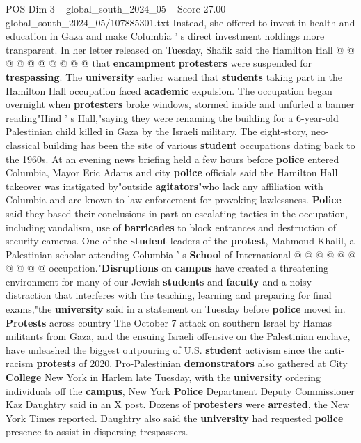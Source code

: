 \begin{textsample}{POS Dim 3 – global\_south\_2024\_05 – Score 27.00 – global\_south\_2024\_05/107885301.txt}
Instead, she offered to invest in health and education in Gaza and make Columbia ' s direct investment holdings more transparent.
In her letter released on Tuesday, Shafik said the Hamilton Hall @ @ @ @ @ @ @ @ @ @ that \textbf{encampment} \textbf{protesters} were suspended for \textbf{trespassing}.
The \textbf{university} earlier warned that \textbf{students} taking part in the Hamilton Hall occupation faced \textbf{academic} expulsion.
The occupation began overnight when \textbf{protesters} broke windows, stormed inside and unfurled a banner reading"Hind ' s Hall,"saying they were renaming the building for a 6-year-old Palestinian child killed in Gaza by the Israeli military.
The eight-story, neo-classical building has been the site of various \textbf{student} occupations dating back to the 1960s.
At an evening news briefing held a few hours before \textbf{police} entered Columbia, Mayor Eric Adams and city \textbf{police} officials said the Hamilton Hall takeover was instigated by"outside \textbf{agitators}"who lack any affiliation with Columbia and are known to law enforcement for provoking lawlessness. \textbf{Police} said they based their conclusions in part on escalating tactics in the occupation, including vandalism, use of \textbf{barricades} to block entrances and destruction of security cameras.
One of the \textbf{student} leaders of the \textbf{protest}, Mahmoud Khalil, a Palestinian scholar attending Columbia ' s \textbf{School} of International @ @ @ @ @ @ @ @ @ @ occupation."\textbf{Disruptions} on \textbf{campus} have created a threatening environment for many of our Jewish \textbf{students} and \textbf{faculty} and a noisy distraction that interferes with the teaching, learning and preparing for final exams,"the \textbf{university} said in a statement on Tuesday before \textbf{police} moved in. \textbf{Protests} across country The October 7 attack on southern Israel by Hamas militants from Gaza, and the ensuing Israeli offensive on the Palestinian enclave, have unleashed the biggest outpouring of U.S. \textbf{student} activism since the anti-racism \textbf{protests} of 2020.
Pro-Palestinian \textbf{demonstrators} also gathered at City \textbf{College} New York in Harlem late Tuesday, with the \textbf{university} ordering individuals off the \textbf{campus}, New York \textbf{Police} Department Deputy Commissioner Kaz Daughtry said in an X post.
Dozens of \textbf{protesters} were \textbf{arrested}, the New York Times reported.
Daughtry also said the \textbf{university} had requested \textbf{police} presence to assist in dispersing trespassers.

\end{textsample}
